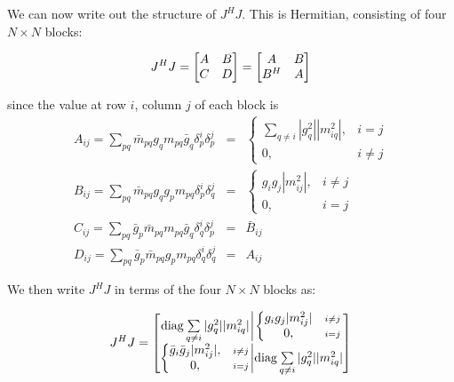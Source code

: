 \documentclass[useAMS,usenatbib]{mn2e}
\newcommand{\JJ}{J} %
\begin{document}
We can now write out the structure of $\JJ^H\JJ$. This is Hermitian, consisting of four $N\times N$ blocks:

\[
\JJ^H\JJ = \Matrix{cc}{A&B\\C&D} = \Matrix{cc}{A&B\\B^H&A}
\]

since the value at row $i$, column $j$ of each block is
\begin{eqnarray}
A_{ij} = \sum_{pq} \bar{m}_{pq} g_q m_{pq} \bar{g}_q \delta^{i}_p \delta^{j}_p &=& 
  \left \{ \begin{array}{cc}
        \sum_{q\ne i} |g_{q}^2| |m_{iq}^2|, & i=j \\
        0, & i\ne j
  \end{array} \right .\nonumber\\ 
B_{ij} = \sum_{pq} \bar{m}_{pq} g_q g_p m_{pq} \delta^{i}_p \delta^{j}_q &=& 
  \left \{ \begin{array}{cc}
      g_{i} g_{j} |m_{ij}^2|, & i\ne j\\
      0, & i=j
  \end{array} \right .\nonumber\\ 
C_{ij} = \sum_{pq} \bar{g}_p \bar{m}_{pq} m_{pq} \bar{g}_q \delta^{i}_q \delta^{j}_p &=& 
  \bar{B}_{ij} \nonumber\\
D_{ij} = \sum_{pq} \bar{g}_p \bar{m}_{pq} g_p m_{pq} \delta^{i}_q \delta^{j}_q &=& A_{ij} 
\label{eq:JHJ:DI:ABCD}
\end{eqnarray}

We then write $\JJ^H\JJ$ in terms of the four $N\times N$ blocks as:

\begin{equation}
\label{eq:JHJ:DI}
\JJ^H \JJ = \Matrix{c@{\bigg |}c}{
\mathrm{diag} \sum\limits_{q\ne i} |g^2_{q}| |m^2_{iq}| & 
  \left \{ 
  \begin{array}{@{}cc@{}}
   g_{i} g_{j} |m^2_{ij}|&{\scriptstyle i\ne j} \\
   0, &{\scriptstyle i=j}
  \end{array} \right .\\
  \left \{ 
  \begin{array}{@{}cc@{}}
   \bar{g}_{i} \bar{g}_{j} |m^2_{ij}|,&{\scriptstyle i\ne j} \\
   0, &{\scriptstyle i=j}
  \end{array} \right . 
  & \mathrm{diag} \sum\limits_{q\ne i} |g^2_{q}| |m^2_{iq}| 
}
\end{equation}
\end{document}
